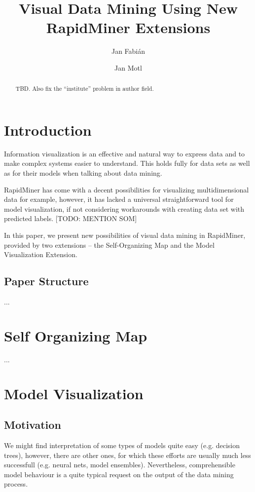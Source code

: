 \documentclass[10pt, twoside]{article}
\date{}           %
\title{\LARGE \bfseries Visual Data Mining Using New RapidMiner Extensions}
\author{Jan Fabi\'{a}n \and Jan Motl
}
\begin{document}
\maketitle\thispagestyle{empty}

\begin{abstract}
TBD.
Also fix the ``institute'' problem in author field.
\end{abstract}

\section{Introduction}

Information visualization is an effective and natural way to express data
and to make complex systems easier to understand.
This holds fully for data sets as well as for their models when talking about data mining.

RapidMiner has come with a decent possibilities for visualizing
multidimensional data for example, however, it has lacked
a universal straightforward tool for model visualization,
if not considering workarounds with creating data set with predicted labels.
[TODO: MENTION SOM]

In this paper, we present new possibilities of visual data mining in RapidMiner,
provided by two extensions -- the Self-Organizing Map and the Model Visualization Extension.

\subsection{Paper Structure}

...

\section{Self Organizing Map}

...

\section{Model Visualization}

\subsection{Motivation}

We might find interpretation of some types of models quite easy (e.g. decision trees),
however, there are other ones, for which these efforts are usually much less successfull
(e.g. neural nets, model ensembles).
Nevertheless, comprehensible model behaviour is a quite typical request on the output of the data mining process.
\end{document}
